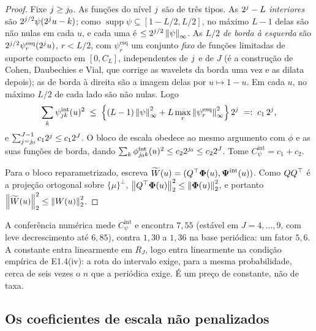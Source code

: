 \documentclass[11pt,a4paper]{article}
\newcommand{\bPsi}{\boldsymbol{\Psi}}
\newcommand{\bPhi}{\boldsymbol{\Phi}}
\newcommand{\Cpsiint}{C_{\psi}^{\mathrm{int}}}
\begin{document}
\begin{proof}
Fixe $j \ge j_{0}$. As funções do nível $j$ são de três tipos. As
$2^{j}-L$ \emph{interiores} são $2^{j/2}\psi(2^{j}u - k)$; como
$\operatorname{supp}\psi\subseteq[1-L/2,L/2]$, no máximo $L-1$ delas são não nulas
em cada $u$, e cada uma é $\le 2^{j/2}\left\lVert \psi \right\rVert_{\infty}$. As $L/2$
\emph{de borda à esquerda} são $2^{j/2}\psi^{\mathrm{esq}}_{r}(2^{j}u)$,
$r < L/2$, com $\psi^{\mathrm{esq}}_{r}$ um conjunto \emph{fixo} de funções
limitadas de suporte compacto em $[0, C_{L}]$, independentes de $j$ e de
$J$ (é a construção de Cohen, Daubechies e Vial, que corrige as wavelets da
borda uma vez e as dilata depois); as de borda à direita são a imagem delas
por $u\mapsto 1-u$. Em cada $u$, no máximo $L/2$ de cada lado são não nulas.
Logo
\[
  \sum_{k}\psi^{\mathrm{int}}_{jk}(u)^{2}
  \;\le\; \Bigl\{(L-1)\left\lVert \psi \right\rVert_{\infty}^{2}
  + L\max_{r}\left\lVert \psi^{\mathrm{esq}}_{r} \right\rVert_{\infty}^{2}\Bigr\}\,2^{j}
  \;=:\; c_{1}\,2^{j},
\]
e $\sum_{j=j_{0}}^{J-1}c_{1}2^{j} \le c_{1}2^{J}$. O bloco de escala
obedece ao mesmo argumento com $\phi$ e as suas funções de borda, dando
$\sum_{k}\phi^{\mathrm{int}}_{j_{0}k}(u)^{2} \le c_{2}2^{j_{0}} \le
c_{2}2^{J}$. Tome $\Cpsiint = c_{1} + c_{2}$.

Para o bloco reparametrizado, escreva $\widetilde W(u) = (Q\T\bPhi(u),
\bPsi^{\mathrm{int}}(u))$. Como $QQ^{\top}$ é a projeção ortogonal sobre
$\{\mu\}^{\perp}$, $\norm{Q\T\bPhi(u)}_{2}^{2} \le \norm{\bPhi(u)}_{2}^{2}$, e
portanto $\left\lVert \widetilde W(u) \right\rVert_{2}^{2}\le\left\lVert W(u) \right\rVert_{2}^{2}$.
\end{proof}

A conferência numérica mede $\Cpsiint$ e encontra $7{,}55$ (estável em
$J = 4,\dots,9$, com leve decrescimento até $6{,}85$), contra $1{,}30$ a
$1{,}36$ na base periódica: um fator $5{,}6$. A constante entra linearmente em
$R_{J}$, logo entra linearmente na condição empírica de E1.4(iv): a rota do
intervalo exige, para a mesma probabilidade, cerca de seis vezes o $n$ que a
periódica exige. É um preço de constante, não de taxa.

\subsection*{Os coeficientes de escala não penalizados}
\end{document}
